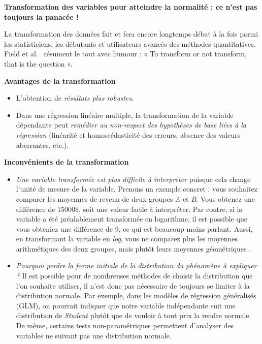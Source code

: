\documentclass[
  11pt,
  french,
]{book}
\makeatletter
\providecommand{\tightlist}{%
  \setlength{\itemsep}{0pt}\setlength{\parskip}{0pt}}
\newenvironment{kframev}{%
\medskip{}
\setlength{\fboxsep}{.8em}
 \def\at@end@of@kframev{}%
 \ifinner\ifhmode%
  \def\at@end@of@kframev{\end{minipage}}%
  \begin{minipage}{\columnwidth}%
 \fi\fi%
 \def\FrameCommand##1{\hskip\@totalleftmargin \hskip-\fboxsep
 \colorbox{shadebluecolor}{##1}\hskip-\fboxsep
     \hskip-\linewidth \hskip-\@totalleftmargin \hskip\columnwidth}%
 \MakeFramed {\advance\hsize-\width
   \@totalleftmargin\z@ \linewidth\hsize
   \@setminipage}}%
 {\par\unskip\endMakeFramed%
 \at@end@of@kframev}
\newenvironment{rmdblock}[1]
  {
  \begin{itemize}
  \renewcommand{\labelitemi}{
    \raisebox{-.7\height}[0pt][0pt]{
      {\setkeys{Gin}{width=3em,keepaspectratio}\texttt{[image: images/\#1]}}
    }
  }
  \setlength{\fboxsep}{1em}
  \begin{kframev}
  \small
  \item
  }
  {
  \end{kframev}
  \end{itemize}
  }
\newenvironment{bloc_attention}
  {\begin{rmdblock}{attention}}
  {\end{rmdblock}}
\makeatother
\begin{document}
\begin{bloc_attention}

\textbf{Transformation des variables pour atteindre la normalité : ce n'est pas toujours la panacée !}

La transformation des données fait et fera encore longtemps débat à la fois parmi les statisticiens, les débutants et utilisateurs avancés des méthodes quantitatives. Field et al.~\citeyearpar[pp.~193]{field2012discovering} résument le tout avec humour : « To transform or not transform, that is the question ».

\textbf{Avantages de la transformation}

\begin{itemize}
\tightlist
\item
  L'obtention de \emph{résultats plus robustes}.
\item
  Dans une régression linéaire multiple, la transformation de la variable dépendante peut \emph{remédier au non-respect des hypothèses de base liées à la régression} (linéarité et homoscédasticité des erreurs, absence des valeurs aberrantes, etc.).
\end{itemize}

\textbf{Inconvénients de la transformation}

\begin{itemize}
\item
  \emph{Une variable transformée est plus difficile à interpréter} puisque cela change l'unité de mesure de la variable. Prenons un exemple concret : vous souhaitez comparer les moyennes de revenu de deux groupes \emph{A} et \emph{B}. Vous obtenez une différence de 15000\$, soit une valeur facile à interpréter. Par contre, si la variable a été préalablement transformée en logarithme, il est possible que vous obteniez une différence de 9, ce qui est beaucoup moins parlant. Aussi, en transformant la variable en \emph{log}, vous ne comparez plus les moyennes arithmétiques des deux groupes, mais plutôt leurs moyennes géométriques \citep[pp.~193]{field2012discovering}.
\item
  \emph{Pourquoi perdre la forme initiale de la distribution du phénomène à expliquer ?} Il est possible pour de nombreuses méthodes de choisir la distribution que l'on souhaite utiliser, il n'est donc pas nécessaire de toujours se limiter à la distribution normale. Par exemple, dans les modèles de régression généralisés (GLM), on pourrait indiquer que notre variable indépendante suit une distribution de \emph{Student} plutôt que de vouloir à tout prix la rendre normale. De même, certains tests non-paramétriques permettent d'analyser des variables ne suivant pas une distribution normale.
\end{itemize}


\end{bloc_attention}
\end{document}
